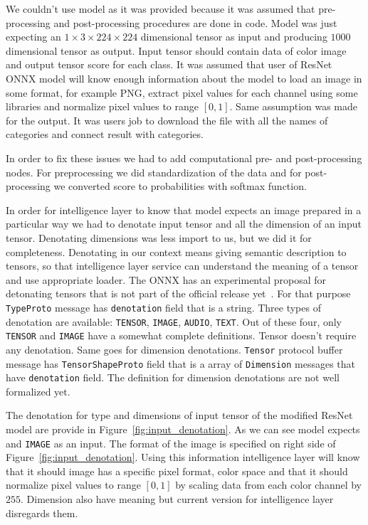 \documentclass[english, 12pt, a4paper, elec, utf8, online]{aaltothesis}
\begin{document}
We couldn't use model as it was provided because it was assumed that pre-processing and post-processing procedures are done in code. Model was just expecting an $1 \times 3 \times 224 \times 224$ dimensional tensor as input and producing $1000$ dimensional tensor as output. Input tensor should contain data of color image and output tensor score for each class. It was assumed that user of ResNet ONNX model will know enough information about the model to load an image in some format, for example PNG, extract pixel values for each channel using some libraries and normalize pixel values to range $[0,1]$. Same assumption was made for the output. It was users job to download the file with all the names of categories and connect result with categories. 

In order to fix these issues we had to add computational pre- and post-processing nodes. For preprocessing we did standardization of the data and for post-processing we converted score to probabilities with softmax function.

In order for intelligence layer to know that model expects an image prepared in a particular way we had to denotate input tensor and all the dimension of an input tensor. Denotating dimensions was less import to us, but we did it for completeness. Denotating in our context means giving semantic description to tensors, so that intelligence layer service can understand the meaning of a tensor and use appropriate loader. The ONNX has an experimental proposal for detonating tensors that is not part of the official release yet~\cite{onnx_denotations}. For that purpose \texttt{TypeProto} message has \texttt{denotation} field that is a string. Three types of denotation are available: \texttt{TENSOR}, \texttt{IMAGE}, \texttt{AUDIO}, \texttt{TEXT}. Out of these four, only \texttt{TENSOR} and \texttt{IMAGE} have a somewhat complete definitions. Tensor doesn't require any denotation. Same goes for dimension denotations. \texttt{Tensor} protocol buffer message has \texttt{TensorShapeProto} field that is a array of \texttt{Dimension} messages that have \texttt{denotation} field. The definition for dimension denotations are not well formalized yet. 


The denotation for type and dimensions of input tensor of the modified ResNet model are provide in Figure~\ref{fig:input_denotation}. As we can see model expects and \texttt{IMAGE} as an input. The format of the image is specified on right side of Figure~\ref{fig:input_denotation}. Using this information intelligence layer will know that it should image has a specific pixel format, color space and that it should normalize pixel values to range $[0, 1]$ by scaling data from each color channel by $255$. Dimension also have meaning but current version for intelligence layer disregards them.    
\end{document}

